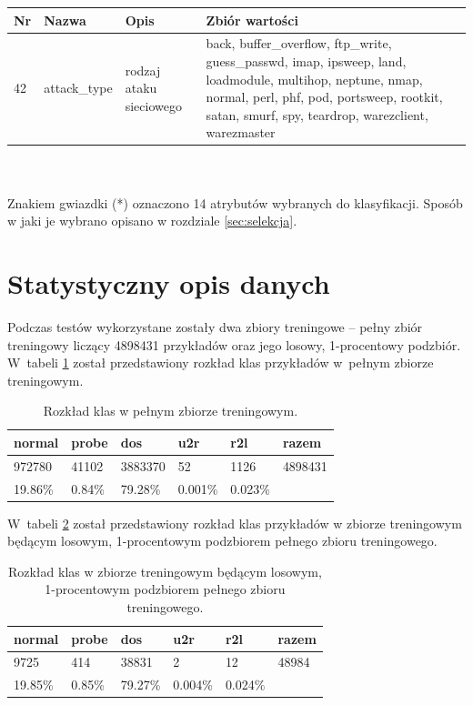 \documentclass[a4paper, 12pt]{article}
\begin{document}
\begin{tabular}{ | l | l | p{} | p{} | } \hline
Nr & Nazwa & Opis & Zbiór wartości \\ \hline
42      & attack\_type & rodzaj ataku sieciowego & back, buffer\_overflow, ftp\_write, guess\_passwd, imap, ipsweep, land, loadmodule, multihop, neptune, nmap, normal, perl, phf, pod, portsweep, rootkit, satan, smurf, spy, teardrop, warezclient, warezmaster \\ \hline
\end{tabular} \\\\

Znakiem gwiazdki (*) oznaczono 14 atrybutów wybranych do klasyfikacji.
Sposób w jaki je wybrano opisano w rozdziale \ref{sec:selekcja}.

\section{Statystyczny opis danych}

Podczas testów wykorzystane zostały dwa zbiory treningowe -- pełny zbiór treningowy 
liczący 4898431 przykładów oraz jego losowy, 1-procentowy podzbiór.
W~tabeli \ref{table:100percent} został przedstawiony rozkład klas przykładów w~pełnym zbiorze
treningowym. 

\begin{table}[H]
\centering
\begin{tabular}{ | l | l | l | l | l | l | } \hline
	normal & probe & dos & u2r & r2l & razem \\  \hline
	972780 & 41102 & 3883370 & 52 & 1126 & 4898431 \\ \hline
	19.86\% & 0.84\% & 79.28\% & 0.001\% & 0.023\% & \\ \hline
\end{tabular}
\caption{Rozkład klas w pełnym zbiorze treningowym.}
\label{table:100percent}
\end{table}

W~tabeli \ref{table:1percent} został przedstawiony rozkład klas przykładów w 
zbiorze treningowym będącym losowym, 1-procentowym
podzbiorem pełnego zbioru treningowego.
\begin{table}[H]
\centering
\begin{tabular}{ | l | l | l | l | l | l | } \hline
	normal & probe & dos & u2r & r2l & razem \\ \hline
	9725 & 414 & 38831 & 2 & 12 & 48984 \\ \hline
	19.85\%  & 0.85\%  & 79.27\% & 0.004\%  & 0.024\% &  \\ \hline
\end{tabular}
\caption{Rozkład klas w zbiorze treningowym będącym losowym, 1-procentowym
 podzbiorem pełnego zbioru treningowego.}
\label{table:1percent}
\end{table}
\end{document}
